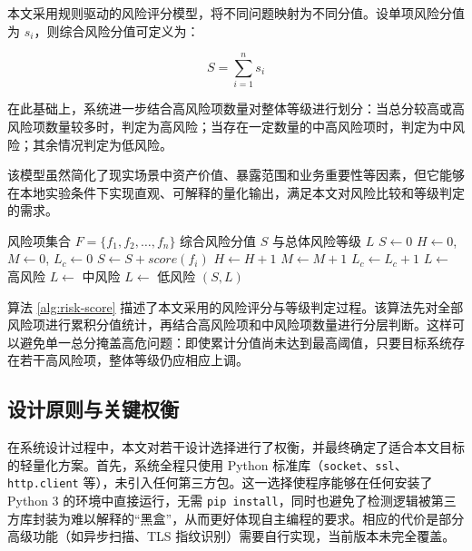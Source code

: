 \documentclass[12pt,a4paper,fontset=none]{ctexart}
\begin{document}
本文采用规则驱动的风险评分模型，将不同问题映射为不同分值。设单项风险分值为 $s_i$，则综合风险分值可定义为：

\begin{equation}
S = \sum_{i=1}^{n} s_i
\end{equation}

在此基础上，系统进一步结合高风险项数量对整体等级进行划分：当总分较高或高风险项数量较多时，判定为高风险；当存在一定数量的中高风险项时，判定为中风险；其余情况判定为低风险。

该模型虽然简化了现实场景中资产价值、暴露范围和业务重要性等因素，但它能够在本地实验条件下实现直观、可解释的量化输出，满足本文对风险比较和等级判定的需求。

\begin{algorithm}[H]
\caption{风险评分与等级判定算法}
\label{alg:risk-score}
\begin{algorithmic}[1]
\Require 风险项集合 $F=\{f_1,f_2,\dots,f_n\}$
\Ensure 综合风险分值 $S$ 与总体风险等级 $L$
\State $S \gets 0$
\State $H \gets 0$, $M \gets 0$, $L_c \gets 0$
  \State $S \gets S + score(f_i)$
    \State $H \gets H + 1$
    \State $M \gets M + 1$
  \Else
    \State $L_c \gets L_c + 1$
  \EndIf
\EndFor
{}
  \State $L \gets$ 高风险
  \State $L \gets$ 中风险
\Else
  \State $L \gets$ 低风险
\EndIf
\State \Return $(S, L)$
\end{algorithmic}
\end{algorithm}

算法 \ref{alg:risk-score} 描述了本文采用的风险评分与等级判定过程。该算法先对全部风险项进行累积分值统计，再结合高风险项和中风险项数量进行分层判断。这样可以避免单一总分掩盖高危问题：即使累计分值尚未达到最高阈值，只要目标系统存在若干高风险项，整体等级仍应相应上调。

\subsection{设计原则与关键权衡}

在系统设计过程中，本文对若干设计选择进行了权衡，并最终确定了适合本文目标的轻量化方案。首先，系统全程只使用 Python 标准库（\texttt{socket}、\texttt{ssl}、\texttt{http.client} 等），未引入任何第三方包。这一选择使程序能够在任何安装了 Python 3 的环境中直接运行，无需 \texttt{pip install}，同时也避免了检测逻辑被第三方库封装为难以解释的“黑盒”，从而更好体现自主编程的要求。相应的代价是部分高级功能（如异步扫描、TLS 指纹识别）需要自行实现，当前版本未完全覆盖。
\end{document}
